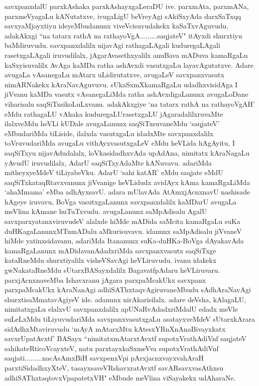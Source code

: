 \begin{artha}
savxpanxdalU parxkAshaka parxkAshayxgaLeraDU ive. parxmAta, parxmANa, parxmeVyagaLu kANutatxve, ivugaLigU beVreyAgi sAkiSxyAda darxSaTxqq savxyaMjoyxtiyu ideyeMbudanunx viveVcisuvudakekx kaSaTxvAguvudu. adakAkxgi ``na tatarx rathA na rathayoVgA.........saqjateV" itAyxdi shurxtiyu baMdiruvudu. savxpanxdalilx nijavAgi rathagaLAgali kuduregaLAgali rasetxgaLAgali iruvudilalx, jAgarAvasethxyalilx anuBava mADuva kamaRgaLu kaSxyisuvalilx AvAga kaMDa ratha ashAvxdi vasutxgaLu layavAgutatxve. Adare avugaLa vAsanegaLu mAtarx uLidirutatxve, avugaLeV savxpanxvasutx nimARNakekx kAraNavAguvuvu. sUkaSxmXkamaRgaLu udadhxvisidAga I jiVvanu kaMDa vasutx vAsanegaLiMda ratha ashAvxdigaLanunx avugaLoDane viharisalu saqSiTxsikoLuLxvanu. adakAkxgiye `na tatarx rathA na rathayoVgAH' eMdu rathagaLU vAhaka kuduregaLU\break rasetxgaLU jAgaradalilxruvaMte ilalxveMdu heVLi kUDale avugaLanunx saqSiTxsuvaneMdu `saqjateV' eMbudariMda tiLiside, ilalxda vasutxgaLu idadxMte savxpanxdalilx toVruvudariMda avugaLu vithAyxvasutxgaLeV eMdu heVLida hAgAyitu, I saqSiTxyu nijavAdudalalx, loVkasidadhxvAda upAdAna, nimitatx kAraNagaLu yAvudU iruvudilalx, AdarU saqSiTxyAdaMte kANuvavu. adariMda mitheyxyeMdeV tiLiyabeVku. AdarU `sahi katAR' eMdu saqjate eMdU saqSiTxkataqRtavxvanunx jiVvanige heVLidudx avidAyx kAma kamaRgaLiMda `ahaMmama' eMba adhAyxsavU. adara mUlavAda AtAmxjAcnxnavU nashisade hAgeye iruvavu, BoVga vasutxgaLanunx savxpanxdalilx kaMDarU avugaLa meVlina kAmane huTuTxvudu. avugaLanunx saMpAdisalu AgalU savxparxyatanxviruvudeV alalxde hiMde mADida saMcita kamaRgaLu suKa duHKagaLanunxMTumADalu aMkurisuvavu. idanunx saMpAdisalu jiVvaneV hiMde yatinxsidavanu, adariMda Itananunx suKa-duHKa-BoVga dAyakavAda kamaRgaLanunx mADidavanAdadxriMda savxpanxvasutx saqSiTxge kataRneMdu shurxtiyalilx visheVSavAgi heVLiruvudu. ivanu idakekx gwNakataRneMdu sUtarxBASayxdalilx BagavatfpAdaru heVLiruvaru. parxjAcnxnaveMba Ishavxranu jAgara parxpaMcakUkx savxpanx parxpaMcakUkx kAraNanAgi adhiSAThxtaqvAgiruvaneMbudu sAdhAraNavAgi shurxtisaMmatavAgiyeV ide. adanunx nirAkarisilalx. adare deVsha, kAlagaLU, nimitatxgaLu elalxvU savxpanxdalilx apUNaRvAdadxriMdalU edadx meVle suLeLxMdu tiLiyuvudariMda savxpanxvasutxgaLu asatayxveMdeV sUtarxkArara sidAdhxMtaviruvudu `mAyA mAtarxMtu kAtesxYRnXnAnaBivayxkatx savxrUpatAvxtf' BASayx ``nimitatxmAtarxtAvxtf supotxVrathAdiVnf saqjateV sahi\-\break kateRticoVcayxteV, natu parxtayxkaSxmeVva supotxVrathAdiVnf saqjati.........\break nacAsAmxBiH savxpenxV\s pi pArxjacnxvayxvahAraH parxtiSidadhxyXteV, tasayx\break saveVRshavxratAvxtf savARsavxvasAthxsu adhiSAThxtaqtovxVpapatetxVH"  eMbude meVlina viSayakekx udAharaNe.
\end{artha}%

